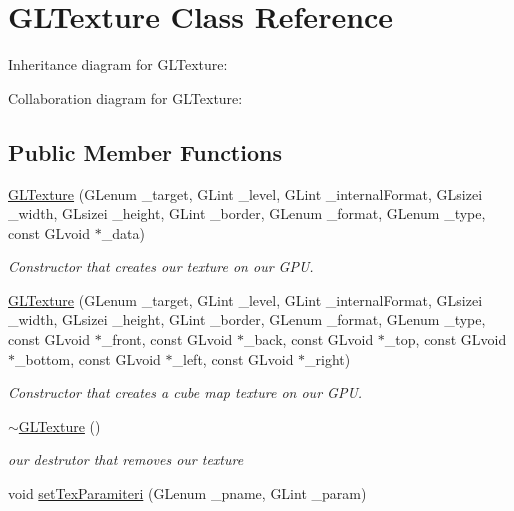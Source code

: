 \hypertarget{class_g_l_texture}{\section{G\-L\-Texture Class Reference}
\label{class_g_l_texture}
}


Inheritance diagram for G\-L\-Texture\-:


Collaboration diagram for G\-L\-Texture\-:
\subsection*{Public Member Functions}
\begin{DoxyCompactItemize}
\item 
\hyperlink{class_g_l_texture_a1f0c33b32b1e37985976b6f10c2263c3}{G\-L\-Texture} (G\-Lenum \-\_\-target, G\-Lint \-\_\-level, G\-Lint \-\_\-internal\-Format, G\-Lsizei \-\_\-width, G\-Lsizei \-\_\-height, G\-Lint \-\_\-border, G\-Lenum \-\_\-format, G\-Lenum \-\_\-type, const G\-Lvoid $\ast$\-\_\-data)
\begin{DoxyCompactList}\small\item\em Constructor that creates our texture on our G\-P\-U. \end{DoxyCompactList}\item 
\hyperlink{class_g_l_texture_a0ec835c5a25261ce08b43b7a1601fc8f}{G\-L\-Texture} (G\-Lenum \-\_\-target, G\-Lint \-\_\-level, G\-Lint \-\_\-internal\-Format, G\-Lsizei \-\_\-width, G\-Lsizei \-\_\-height, G\-Lint \-\_\-border, G\-Lenum \-\_\-format, G\-Lenum \-\_\-type, const G\-Lvoid $\ast$\-\_\-front, const G\-Lvoid $\ast$\-\_\-back, const G\-Lvoid $\ast$\-\_\-top, const G\-Lvoid $\ast$\-\_\-bottom, const G\-Lvoid $\ast$\-\_\-left, const G\-Lvoid $\ast$\-\_\-right)
\begin{DoxyCompactList}\small\item\em Constructor that creates a cube map texture on our G\-P\-U. \end{DoxyCompactList}\item 
\hypertarget{class_g_l_texture_a7a0f04b3bd68c77588c0aea9b30b08c4}{\hyperlink{class_g_l_texture_a7a0f04b3bd68c77588c0aea9b30b08c4}{$\sim$\-G\-L\-Texture} ()}\label{class_g_l_texture_a7a0f04b3bd68c77588c0aea9b30b08c4}

\begin{DoxyCompactList}\small\item\em our destrutor that removes our texture \end{DoxyCompactList}\item 
\hypertarget{class_g_l_texture_add43b53521541bad76faec1cc5292048}{void \hyperlink{class_g_l_texture_add43b53521541bad76faec1cc5292048}{set\-Tex\-Paramiteri} (G\-Lenum \-\_\-pname, G\-Lint \-\_\-param)}\label{class_g_l_texture_add43b53521541bad76faec1cc5292048}


\end{DoxyCompactItemize}
